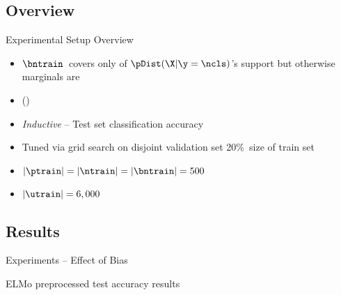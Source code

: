 \subsection{Overview}
\begin{frame}{Experimental Setup Overview}
  \onslide<+->{}
  \begin{itemize}[<+->]
    \setlength{\itemsep}{6pt}
    \item $\bntrain$~covers only  of ${\pDist(\X \vert \y = \ncls)}$'s support but otherwise marginals are 
    \item () 
  \end{itemize}
  \vfill
  \begin{itemize}[<+->]
    \setlength{\itemsep}{6pt}
    \item \textit{Inductive} -- Test set classification accuracy
  \end{itemize}
  \vfill
  \begin{itemize}[<+->]
    \setlength{\itemsep}{6pt}
    \item Tuned via grid search on disjoint validation set 20\%~size of train set
    \item ${\abs{\ptrain} = \abs{\ntrain} = \abs{\bntrain} = 500}$
    \item ${\abs{\utrain} = 6,000}$
  \end{itemize}
\end{frame}

\subsection{Results}
\begin{frame}{Experiments -- Effect of Bias}
  \begin{minipage}[t]{0.69\linewidth}
    \begin{table}
      \centering
      \caption{ELMo preprocessed test accuracy results}
      
    \end{table}
    \vfill
  \end{minipage}
  \begin{minipage}{0.02\linewidth}
    \hspace{\fill}
  \end{minipage}
  \begin{minipage}[t]{0.26\linewidth}
    \vspace{40pt}
  \end{minipage}
\end{frame}

